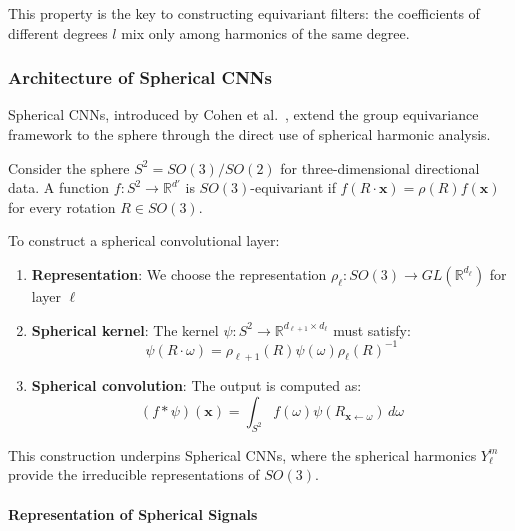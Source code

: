 This property is the key to constructing equivariant filters: the coefficients of different degrees $l$ mix only among harmonics of the same degree.

\subsubsection{Architecture of Spherical CNNs}

Spherical CNNs, introduced by Cohen et al.~\citep{cohen2018sphericalcnns}, extend the group equivariance framework to the sphere through the direct use of spherical harmonic analysis.

\begin{example}\label{ex:spherical_equivariant_layer_cnn}
Consider the sphere $S^2 = SO(3)/SO(2)$ for three-dimensional directional data. A function $f: S^2 \rightarrow \mathbb{R}^{d'}$ is $SO(3)$-equivariant if $f(R \cdot \mathbf{x}) = \rho(R) f(\mathbf{x})$ for every rotation $R \in SO(3)$.

To construct a spherical convolutional layer:
\begin{enumerate}
    \item \textbf{Representation}: We choose the representation $\rho_\ell: SO(3) \rightarrow GL(\mathbb{R}^{d_\ell})$ for layer $\ell$
    \item \textbf{Spherical kernel}: The kernel $\psi: S^2 \rightarrow \mathbb{R}^{d_{\ell+1} \times d_\ell}$ must satisfy:
    \begin{equation}
    \psi(R \cdot \omega) = \rho_{\ell+1}(R) \psi(\omega) \rho_\ell(R)^{-1}
    \end{equation}
    \item \textbf{Spherical convolution}: The output is computed as:
    \begin{equation}
    (f * \psi)(\mathbf{x}) = \int_{S^2} f(\omega) \psi(R_{\mathbf{x} \leftarrow \omega}) \, d\omega
    \end{equation}
\end{enumerate}

This construction underpins Spherical \glspl{CNN}, where the spherical harmonics $Y_\ell^m$ provide the irreducible representations of $SO(3)$.
\end{example}

\paragraph{Representation of Spherical Signals}

